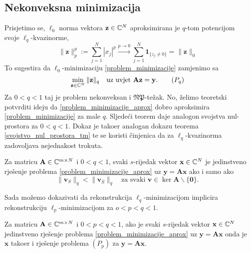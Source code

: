 \documentclass[a4paper,twoside,12pt]{memoir} %
\newcommand{\vect}[1]{\mathbf{#1}}
\renewcommand{\vec}{\vect}
\newcommand{\norm}[1]{\|{#1}\|}
\begin{document}
\subsection[Nekonveksna minimizacija][Nekonveksna minimizacija]{Nekonveksna minimizacija}
Prisjetimo se, $\ell_0$ norma vektora $\vec z \in \C^N$ aproksimirana je $q$-tom potencijom svoje $\ell_q$-kvazinorme,
\begin{equation*}
\|\vec{z}\|_p^p := \sum_{j=1}^N|x_j|^p \xrightarrow{p\rightarrow 0} \sum_{j=1}^N\mathbf{1}_{\{z_j \neq 0\}} = \|\vec{z}\|_0
\end{equation*}
To sugestira da $\ell_0$-minimizaciju \eqref{problem_minimizacije} zamjenimo sa
\begin{equation}
    \min_{\vec z \in \C^N} \norm{\vec z}_q \quad \text{uz uvjet }\vec{Az} = \vec{y}.\tag{$P_q$}
\end{equation}
Za $0 < q < 1$ taj je problem nekonveksan i $\mathfrak{NP}$-te\v{z}ak. No, \v{z}elimo teoretski potvrditi ideju da \eqref{problem_minimizacije_aprox} dobro aproksimira \eqref{problem_minimizacije} za male $q$.
Sljede\'ci teorem daje analogon svojstva nul-prostora za $0<q<1$. Dokaz je tako\dj er analogan dokazu teorema \ref{svojstvo_nul_prostora_tm} te se koristi \v{c}injenica da za $\ell_q$-kvazinorma zadovoljava nejednakost trokuta.  
\begin{thm}\label{svojstvo_nul_prostora_tm_2}
    Za matricu $\vec A \in \C^{m \times N}$ i $0<q<1$, svaki $s$-rijedak vektor $\vec x \in \C^N$ je jedinstveno rje\v{s}enje problema \eqref{problem_minimizacije_aprox} uz $\vec y = \vec{Ax}$ ako i samo ako 
    \begin{equation*}
        \norm{\vec v_S}_q < \norm{\vec v_{\bar{S}}}_q  \quad \text{za svaki }\vec v \in \ker \vec A \backslash \{\vec 0\}.
    \end{equation*}
\end{thm}
Sada mo\v{z}emo dokazivati da rekonstrukcija $\ell_q$-minimizacijom implicira rekonstrukciju $\ell_p$-minimizacijom za $o<p<q<1$.
\begin{thm}
    Za matricu $\vec A \in \C^{m \times N}$ i $0<p<q<1$, ako je svaki $s$-rijedak vektor $\vec x \in \C^N$ jedinstveno rje\v{s}enje problema \eqref{problem_minimizacije_aprox} uz $\vec y = \vec{Ax}$  onda je $\vec x$ tako\dj er i rje\v{s}enje problema $(P_p)$ za $\vec y = \vec{Ax}$.
\end{thm}
\end{document}
